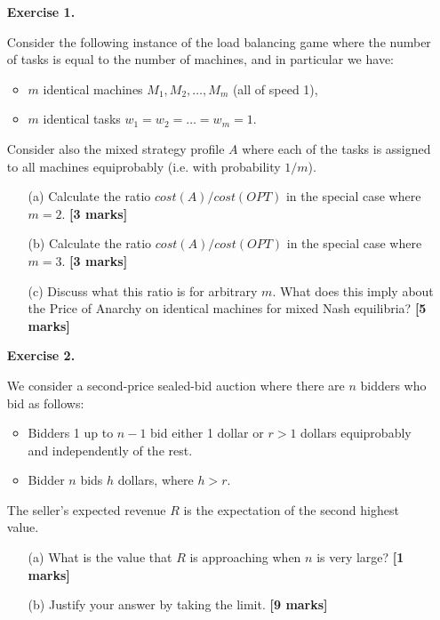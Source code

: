 \documentclass{article}
\begin{document}
\begin{enumerate}
	
	\item[\textbf{Exercise 1.}]   %
	
	Consider the following instance of the load balancing game where the number of tasks is equal to the number of machines, and in particular we have:
	\begin{itemize}
		\item $m$ identical machines $M_1, M_2, \dots, M_m$ (all of speed 1),
		\item $m$ identical tasks $w_1 = w_2 = \dots = w_m = 1$.
	\end{itemize}
	Consider also the mixed strategy profile $A$ where each of the tasks is assigned to all machines equiprobably (i.e. with probability $1/m$). 
	\begin{enumerate}
		\item[(a)] Calculate the ratio $cost(A)/cost(OPT)$ in the special case where $m=2$.  \hfill{\bf [3 marks]}\smallskip
		\item[(b)] Calculate the ratio $cost(A)/cost(OPT)$ in the special case where $m=3$.  \hfill{\bf [3 marks]}\smallskip
		\item[(c)] Discuss what this ratio is for arbitrary $m$. What does this imply about the Price of Anarchy on identical machines for mixed Nash equilibria?  \hfill{\bf [5 marks]}\smallskip
	\end{enumerate}
	\vspace*{0.8cm}
	

	\item[\textbf{Exercise 2.}]  %

	We consider a second-price sealed-bid auction where there are $n$ bidders who bid as follows:
	\begin{itemize}
		\item Bidders 1 up to $n-1$ bid either 1 dollar or $r > 1$ dollars equiprobably and
		independently of the rest.
		\item Bidder $n$ bids $h$ dollars, where $h > r$.
	\end{itemize}
	The seller's expected revenue $R$ is the expectation of the second highest value. 
	\begin{itemize}
		\item[(a)] What is the value that $R$ is approaching when $n$ is very large? \hfill{\bf [1 marks]}\smallskip
		\item[(b)] Justify your answer by taking the limit. \hfill{\bf [9 marks]}\smallskip
	\end{itemize}


\end{enumerate}
\end{document}
